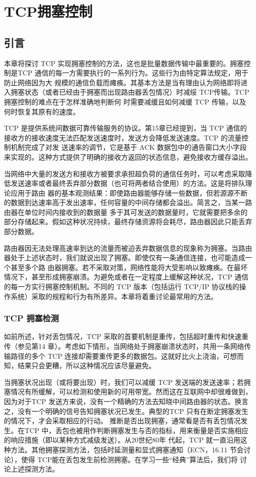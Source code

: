 \chapter{TCP拥塞控制}

\section{引言}
本章将探讨 TCP 实现拥塞控制的方法，这也是批量数据传输中最重要的。拥塞控制是TCP 通信的每一方需要执行的一系列行为。这些行为由特定算法规定，用于防止网络因为大
规模的通信负载而瘫痪。其基本方法是当有理由认为网络即将进入拥塞状态（或者已经由于拥塞而出现路由器丢包情况）时减绥 TCP传输。TCP 拥塞控制的难点在于怎样准确地判断何
时需要减缓且如何减缓 TCP 传输，以及何时恢复其原有的速度。

TCP 是提供系统间数据可靠传输服务的协议。第15章已经提到，当 TCP 通信的接收方的接收速度无法匹配发送速度时，发送方会降低发送速度。TCP 的流量控制机制完成了对发
送速率的调节，它是基于 ACK 数据包中的通告窗口大小字段来实现的。这种方式提供了明确的接收方返回的状态信息，避免接收方缓存溢出。

当网络中大量的发送方和接收方被要求承担超负荷的通信任务时，可以考虑采取降低发送速率或者最终丢弃部分数据（也可将两者结合使用）的方法。这是将排队理论应用于路由
器的基本观测结果：即使路由器能够存储一些数据，但若源源不断的数据到达速率高于发出速率，任何容量的中间存储都会溢出。简言之，当某一路由器在单位时间内接收到的数据量
多于其可发送的数据量时，它就需要把多余的部分存储起来。假如这种状况持续，最终存储资源将会耗尽，路由器因此只能丢弃部分数据。

路由器因无法处理高速率到达的流量而被迫丢弃数据信息的现象称为拥塞。当路由器处于上述状态时，我们就说出现了拥塞。即使仅有一条通信连接，也可能造成一个甚至多个路
由器拥塞。若不采取对策，网络性能将大受影响以致瘫痪。在最坏情况下，甚至形成拥塞崩溃。为避免或者在一定程度上缓解这种状况，TCP 通信的每一方实行拥塞控制机制。不同的
TCP 版本（包括运行 TCP/IP 协议栈的操作系统）采取的规程和行为有所差异。本章将着重讨论最常用的方法。
\subsection{TCP 拥塞检测}
如前所述，针对丢包情况，TCP 采取的首要机制是重传，包括超时重传和快速重传（参见第14 章）。考虑如下情形，当网络处于拥塞崩溃状态时，共用一条网络传输路径的多个
TCP 连接却需要重传更多的数据包。这就好比火上浇油，可想而知，结果只会更糟，所以这种情况应该尽量避免。

当拥塞状况出现（或将要出现）时，我们可以减缓 TCP 发送端的发送速率；若拥塞情况有所缓解，可以检测和使用新的可用带宽。然而这在互联网中却很难做到，因为对于TCP
发送方来说，没有一个精确的方法去知晓中间路由器的状态。换言之，没有一个明确的信号告知拥塞状况已发生。典型的TCP 只有在断定拥塞发生的情况下，才会采取相应的行动。
推断是否出现拥塞，通常看是否有丢包情况发生。在TCP 中，丢包也被用作判断拥塞发生与否的指标，用来衡量是否实施相应的响应措施（即以某种方式减级发送）。从20世纪80年
代起，TCP 就一直沿用这种方法。其他拥塞探测方法，包括时延测量和显式拥塞通知（ECN，16.11 节会讨论），使得 TCP能在丢包发生前检测拥塞。在学习一些“经典”算法后，我们将
讨论上述探测方法。

